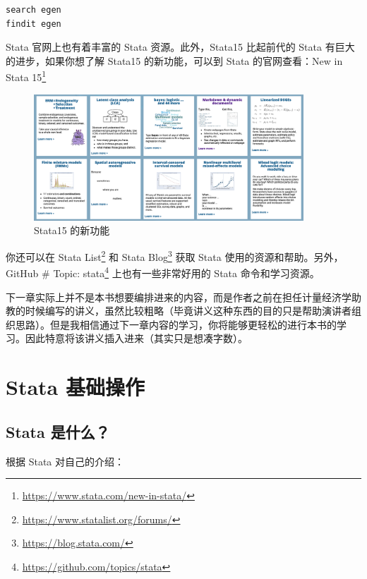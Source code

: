\documentclass[]{ctexbook}
\renewcommand{\href}[2]{#2\footnote{\url{#1}}}
\begin{document}
\begin{lstlisting}
search egen
findit egen
\end{lstlisting}

Stata 官网上也有着丰富的 Stata 资源。此外，Stata15 比起前代的 Stata 有巨大的进步，如果你想了解 Stata15 的新功能，可以到 Stata 的官网查看：\href{https://www.stata.com/new-in-stata/}{New in Stata 15}

\begin{figure}

{\centering \includegraphics[width=0.9\textwidth]{assets/newinstata15} 

}

\caption{Stata15 的新功能}\label{fig:newinstata15}
\end{figure}

你还可以在 \href{https://www.statalist.org/forums/}{Stata List} 和 \href{https://blog.stata.com/}{Stata Blog} 获取 Stata 使用的资源和帮助。另外， \href{https://github.com/topics/stata}{GitHub \# Topic: stata} 上也有一些非常好用的 Stata 命令和学习资源。

下一章实际上并不是本书想要编排进来的内容，而是作者之前在担任计量经济学助教的时候编写的讲义，虽然比较粗略（毕竟讲义这种东西的目的只是帮助演讲者组织思路）。但是我相信通过下一章内容的学习，你将能够更轻松的进行本书的学习。因此特意将该讲义插入进来（其实只是想凑字数）。

\hypertarget{stata--1}{%
\chapter{Stata 基础操作}\label{stata--1}}

\hypertarget{stata--2}{%
\section{Stata 是什么？}\label{stata--2}}

根据 Stata 对自己的介绍：
\end{document}
